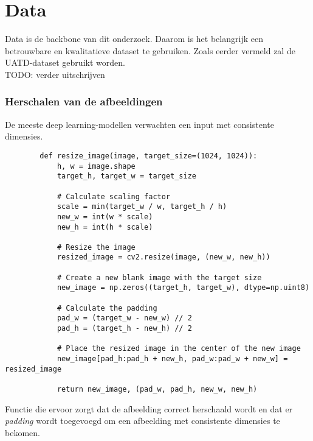 \chapter{Data}
\label{ch:data}

Data is de backbone van dit onderzoek. Daarom is het belangrijk een betrouwbare en kwalitatieve dataset te gebruiken. Zoals eerder vermeld zal de UATD-dataset gebruikt worden. \\

TODO: verder uitschrijven

\subsection{Herschalen van de afbeeldingen}

De meeste deep learning-modellen verwachten een input met consistente dimensies. 

\begin{listing}[H]
    \begin{verbatim}
        def resize_image(image, target_size=(1024, 1024)):
            h, w = image.shape
            target_h, target_w = target_size
            
            # Calculate scaling factor
            scale = min(target_w / w, target_h / h)
            new_w = int(w * scale)
            new_h = int(h * scale)
            
            # Resize the image
            resized_image = cv2.resize(image, (new_w, new_h))
            
            # Create a new blank image with the target size
            new_image = np.zeros((target_h, target_w), dtype=np.uint8)
            
            # Calculate the padding
            pad_w = (target_w - new_w) // 2
            pad_h = (target_h - new_h) // 2
            
            # Place the resized image in the center of the new image
            new_image[pad_h:pad_h + new_h, pad_w:pad_w + new_w] = resized_image
            
            return new_image, (pad_w, pad_h, new_w, new_h)
    \end{verbatim}
    \caption[Functie \texttt{resize\_image}]{Functie die ervoor zorgt dat de afbeelding correct herschaald wordt en dat er \emph{padding} wordt toegevoegd om een afbeelding met consistente dimensies te bekomen.}
\end{listing}


